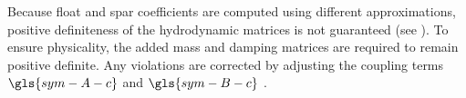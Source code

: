 \documentclass[a4paper,fleqn,colorlinks,unicode,lineno]{cas-dc} %
\begin{document}

Because float and spar coefficients are computed using different approximations, positive definiteness of the hydrodynamic matrices is not guaranteed (see ).
To ensure physicality, the added mass and damping matrices are required to remain positive definite.
Any violations are corrected by adjusting the coupling terms $\gls{sym-A-c}$ and $\gls{sym-B-c}$ .

\end{document}
